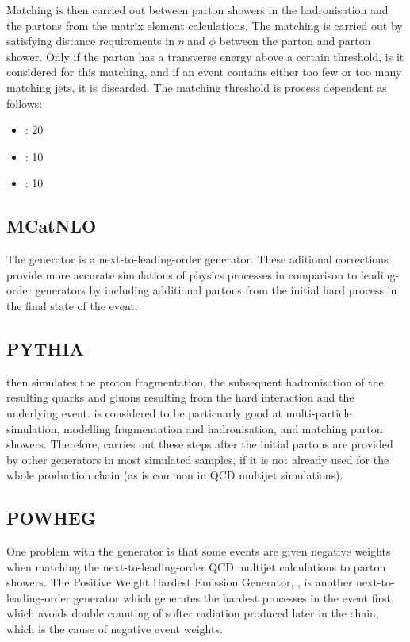 Matching is then carried out between parton showers in the hadronisation and the partons from the
matrix element calculations. The matching is carried out by satisfying distance requirements in $\eta$ and
$\phi$ between the parton and parton shower. Only if the parton has a transverse energy above a certain
threshold, is it considered for this matching, and if an event contains either too few or too many matching jets, it is
discarded. The matching threshold is process dependent as follows:
\begin{itemize}
  \item \ttbar: 20\GeV
  \item \WpJets: 10\GeV
  \item \ZpJets: 10\GeV
\end{itemize}

\subsection{MCatNLO}
\label{ss:mcatnlo}
The \MCATNLO \cite{mcatnlo_Frixione1, mcatnlo_Frixione2} generator is a next-to-leading-order generator. These
aditional corrections provide more accurate simulations of physics processes in comparison to leading-order
generators by including additional partons from the initial hard process in the final state of the event.

\subsection{PYTHIA}
\label{ss:pythia}
\PYTHIA \cite{pythia8} then simulates the proton fragmentation, the subsequent hadronisation of the
resulting quarks and gluons resulting from the hard interaction and the underlying event. \PYTHIA is
considered to be particuarly good at multi-particle simulation, modelling fragmentation and hadronisation, and
matching parton showers. Therefore, \PYTHIA carries out these steps after the initial partons are provided
by other generators in most simulated samples, if it is not already used for the whole production chain (as is
common in QCD multijet simulations).

\subsection{POWHEG}
\label{ss:powheg}
One problem with the \MCATNLO generator is that some events are given negative weights when matching
the next-to-leading-order QCD multijet calculations to parton showers.  The Positive Weight Hardest Emission
Generator, \POWHEG \cite{powheg_Frixione, powheg_Nason, powheg_Alioli}, is another next-to-leading-order
generator which generates the hardest processes in the event first, which avoids double counting of
softer radiation produced later in the chain, which is the cause of negative event weights.

